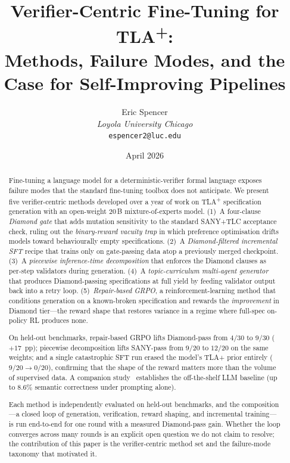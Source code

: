 \documentclass[11pt]{article}
\title{Verifier-Centric Fine-Tuning for TLA\textsuperscript{+}:\\
Methods, Failure Modes, and the Case for Self-Improving Pipelines}
\author{Eric Spencer\\
\small \textit{Loyola University Chicago}\\
\small \texttt{espencer2@luc.edu}}
\date{April 2026}
\begin{document}
\maketitle

\begin{abstract}
Fine-tuning a language model for a deterministic-verifier formal language
exposes failure modes that the standard fine-tuning toolbox does not
anticipate.  We present five verifier-centric methods developed over a
year of work on TLA\textsuperscript{+} specification generation with an
open-weight 20\,B mixture-of-experts model.
(1)~A four-clause \emph{Diamond gate} that adds mutation sensitivity to
the standard SANY+TLC acceptance check, ruling out the
\emph{binary-reward vacuity trap} in which preference optimisation drifts
models toward behaviourally empty specifications.
(2)~A \emph{Diamond-filtered incremental SFT} recipe that trains only on
gate-passing data atop a previously merged checkpoint.
(3)~A \emph{piecewise inference-time decomposition} that enforces the
Diamond clauses as per-step validators during generation.
(4)~A \emph{topic-curriculum multi-agent generator} that produces
Diamond-passing specifications at full yield by feeding validator output
back into a retry loop.
(5)~\emph{Repair-based GRPO}, a reinforcement-learning method that
conditions generation on a known-broken specification and rewards the
\emph{improvement} in Diamond tier---the reward shape that restores
variance in a regime where full-spec on-policy RL produces none.

On held-out benchmarks, repair-based GRPO lifts Diamond-pass from $4/30$
to $9/30$ ($+17$~pp); piecewise decomposition lifts SANY-pass from
$9/20$ to $12/20$ on the same weights; and a single catastrophic SFT run
erased the model's TLA+ prior entirely ($9/20 \to 0/20$), confirming that
the shape of the reward matters more than the volume of supervised data.
A companion study~\cite{ortiz2026formallm} establishes the off-the-shelf
LLM baseline (up to 8.6\% semantic correctness under prompting alone).

Each method is independently evaluated on held-out benchmarks, and the
composition---a closed loop of generation, verification, reward
shaping, and incremental training---is run end-to-end for one round
with a measured Diamond-pass gain.  Whether the loop converges across
many rounds is an explicit open question we do not claim to resolve;
the contribution of this paper is the verifier-centric method set and
the failure-mode taxonomy that motivated it.
\end{abstract}
\end{document}
